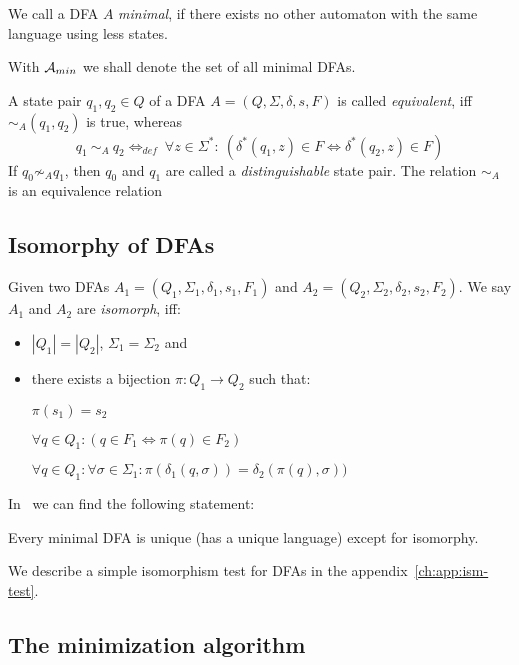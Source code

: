 \begin{definition}
	We call a DFA $A$ \emph{minimal}, if there exists no other automaton with the same language using less states.
\end{definition}
\noindent With ${\mathcal{A}_{min}}$ we shall denote the set of all minimal DFAs.

\begin{definition}\cite[p. 154]{HMU01}
	A state pair $q_1, q_2 \in Q$ of a DFA $A = (Q, \Sigma, \delta, s, F)$ is called \emph{equivalent}, iff $\sim_A(q_1, q_2)$ is true, whereas
	\begin{displaymath}
	q_1\ \sim_A\ q_2 \Leftrightarrow_{def}\ \forall z \in \Sigma^* \colon\ (\delta^*(q_1, z) \in F \Leftrightarrow \delta^*(q_2, z) \in F)
	\end{displaymath}
	If $q_0 \not\sim_A q_1$, then $q_0$ and $q_1$ are called a \emph{distinguishable} state pair. The relation $\sim_A$ is an equivalence relation
\end{definition}

\subsection{Isomorphy of DFAs}\label{ch:1:sec:isom}

Given two DFAs $A_1 = (Q_1, \Sigma_1, \delta_1, s_1, F_1)$ and $A_2 = (Q_2, \Sigma_2, \delta_2, s_2, F_2)$. We say $A_1$ and $A_2$ are \emph{isomorph}, iff:
\begin{itemize}
	\item $|Q_1| = |Q_2|$, $\Sigma_1 = \Sigma_2$ and
	\item there exists a bijection $\pi\colon Q_1 \to Q_2$ such that:
	
	$\pi(s_1) = s_2$
	
	$\forall q\in Q_1\colon (q\in F_1 \Longleftrightarrow \pi(q)\in F_2)$
	
	$\forall q\in Q_1\colon \forall\sigma\in\Sigma_1\colon \pi(\delta_1(q,\sigma))=\delta_2(\pi(q),\sigma))$
\end{itemize}
In~\cite[p. 45]{Sch01} we can find the following statement:
\begin{theorem}\label{ch:1:thm:uniq-ism}
	Every minimal DFA is unique (has a unique language) except for isomorphy.
\end{theorem}
\noindent We describe a simple isomorphism test for DFAs in the appendix~\ref{ch:app:ism-test}.

\subsection{The minimization algorithm}

